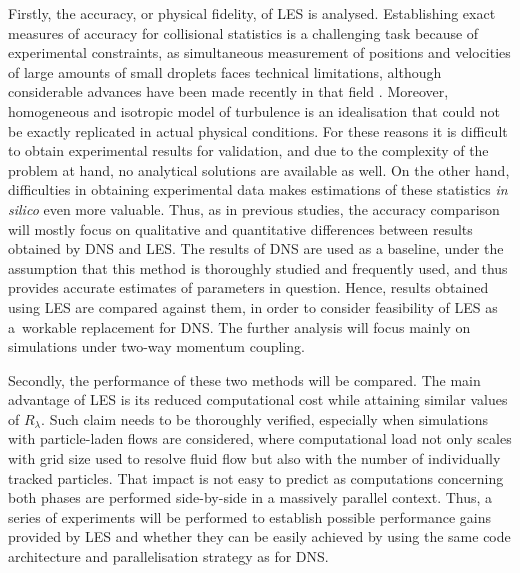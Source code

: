 \documentclass{pracamgren}
\begin{document}
Firstly, the accuracy, or physical fidelity, of LES is analysed.
Establishing exact measures of accuracy for collisional statistics is a challenging task because of experimental constraints, as simultaneous measurement of positions and velocities of large amounts of small droplets faces technical limitations, although considerable advances have been made recently in that field \parencite{Yavuz2018}.
Moreover, homogeneous and isotropic model of turbulence is an idealisation that could not be exactly replicated in actual physical conditions.
For these reasons it is difficult to obtain experimental results for validation, and due to the complexity of the problem at hand, no analytical solutions are available as well.
On the other hand, difficulties in obtaining experimental data makes estimations of these statistics \emph{in silico} even more valuable.
Thus, as in previous studies, the accuracy comparison will mostly focus on qualitative and quantitative differences between results obtained by DNS and LES.
The results of DNS are used as a baseline, under the assumption that this method is thoroughly studied and frequently used, and thus provides accurate estimates of parameters in question.
Hence, results obtained using LES are compared against them, in order to consider feasibility of LES as a~workable replacement for DNS.
The further analysis will focus mainly on simulations under two-way momentum coupling.

Secondly, the performance of these two methods will be compared.
The main advantage of LES is its reduced computational cost while attaining similar values of $R_{\lambda}$.
Such claim needs to be thoroughly verified, especially when simulations with particle-laden flows are considered, where computational load not only scales with grid size used to resolve fluid flow but also with the number of individually tracked particles.
That impact is not easy to predict as computations concerning both phases are performed side-by-side in a massively parallel context.
Thus, a series of experiments will be performed to establish possible performance gains provided by LES and whether they can be easily achieved by using the same code architecture and parallelisation strategy as for DNS.
\end{document}
